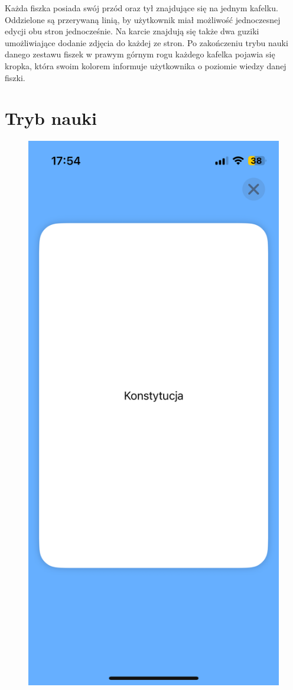 \documentclass[final,a4paper,openany,12pt]{mwbk}
\begin{document}
Każda fiszka posiada swój przód oraz tył znajdujące się na jednym kafelku. Oddzielone są przerywaną linią, by użytkownik miał możliwość jednoczesnej edycji obu stron jednocześnie. Na karcie znajdują się także dwa guziki umożliwiające dodanie zdjęcia do każdej ze stron. Po zakończeniu trybu nauki danego zestawu fiszek w prawym górnym rogu każdego kafelka pojawia się kropka, która swoim kolorem informuje użytkownika o poziomie wiedzy danej fiszki.


\section{Tryb nauki}

\begin{figure}[h]
\centering
\begin{minipage}{0.5\textwidth}
  \centering
\includegraphics[width=.75\linewidth]{img/fishky5.PNG}

\end{minipage}
\end{figure}
\end{document}
